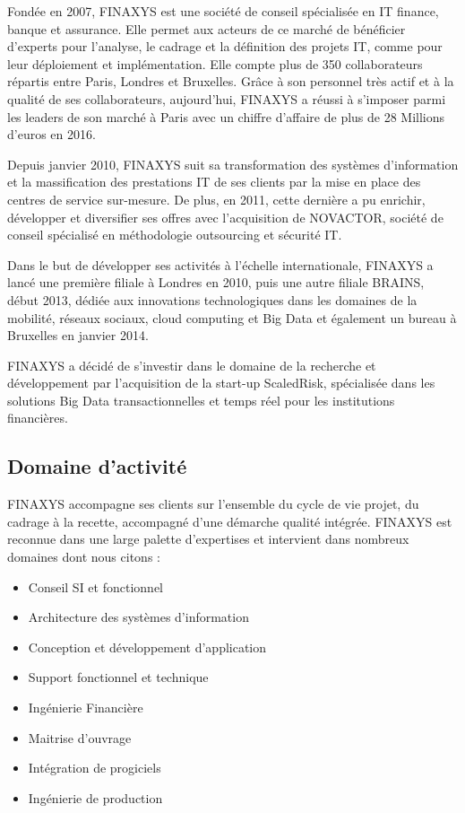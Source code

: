Fondée en 2007, FINAXYS est une société de conseil spécialisée en IT finance, banque et assurance. Elle permet aux acteurs de ce marché de bénéficier d’experts pour l’analyse, le cadrage et la définition des projets IT, comme pour leur déploiement et implémentation. Elle compte plus de 350 collaborateurs répartis entre Paris, Londres et Bruxelles. Grâce à son personnel très actif et à la qualité de ses collaborateurs, aujourd’hui, FINAXYS a réussi à s’imposer parmi les leaders de son marché à Paris avec un chiffre d’affaire de plus de 28 Millions d’euros en 2016. 
\par Depuis janvier 2010, FINAXYS suit sa transformation des systèmes d’information et la massification des prestations IT de ses clients par la mise en place des centres de service sur-mesure. De plus, en 2011, cette dernière a pu enrichir, développer et diversifier ses offres avec l’acquisition de NOVACTOR, société de conseil spécialisé en méthodologie outsourcing et sécurité IT. 
\par Dans le but de développer ses activités à l’échelle internationale, FINAXYS a lancé une première filiale à Londres en 2010, puis une autre filiale BRAINS, début 2013, dédiée aux innovations technologiques dans les domaines de la mobilité, réseaux sociaux, cloud computing et Big Data et également un bureau à Bruxelles en janvier 2014.
\par FINAXYS a décidé de s’investir dans le domaine de la recherche et développement par l’acquisition de la start-up ScaledRisk, spécialisée dans les solutions Big Data transactionnelles et temps réel pour les institutions financières.

\subsection{Domaine d'activité}
FINAXYS accompagne ses clients sur l’ensemble du cycle de vie projet, du cadrage à la recette, accompagné d’une démarche qualité intégrée. FINAXYS est reconnue dans une large palette d’expertises et intervient dans nombreux domaines dont nous citons :
\begin{itemize}  
    \item Conseil SI et fonctionnel
    \item Architecture des systèmes d’information
    \item Conception et développement d’application
    \item Support fonctionnel et technique
    \item Ingénierie Financière
    \item Maitrise d’ouvrage
    \item Intégration de progiciels
    \item Ingénierie de production
\end{itemize}

